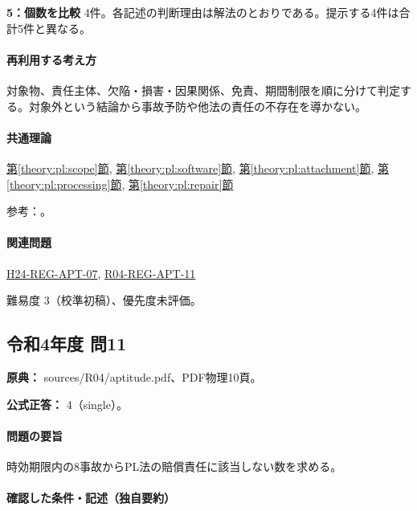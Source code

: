 \noindent\textbf{5：個数を比較} 4件。各記述の判断理由は解法のとおりである。提示する4件は合計5件と異なる。\par

\paragraph{再利用する考え方} 対象物、責任主体、欠陥・損害・因果関係、免責、期間制限を順に分けて判定する。対象外という結論から事故予防や他法の責任の不存在を導かない。

\paragraph{共通理論} \hyperref[theory:pl:scope]{第\ref*{theory:pl:scope}節}, \hyperref[theory:pl:software]{第\ref*{theory:pl:software}節}, \hyperref[theory:pl:attachment]{第\ref*{theory:pl:attachment}節}, \hyperref[theory:pl:processing]{第\ref*{theory:pl:processing}節}, \hyperref[theory:pl:repair]{第\ref*{theory:pl:repair}節}

\par 参考：\cite{pl_statute,pl_qa,pl_definitions2018}。

\paragraph{関連問題} \hyperref[q:h24-reg-apt-07]{H24-REG-APT-07}, \hyperref[q:r04-reg-apt-11]{R04-REG-APT-11}

\par 難易度 3（校準初稿）、優先度未評価。

\subsection{令和4年度 問11}
\label{q:r04-reg-apt-11}

\noindent\textbf{原典：} sources/R04/aptitude.pdf、PDF物理10頁。

\textbf{公式正答：} 4（single）。

\paragraph{問題の要旨} 時効期限内の8事故からPL法の賠償責任に該当しない数を求める。

\paragraph{確認した条件・記述（独自要約）}\mbox{}\par

